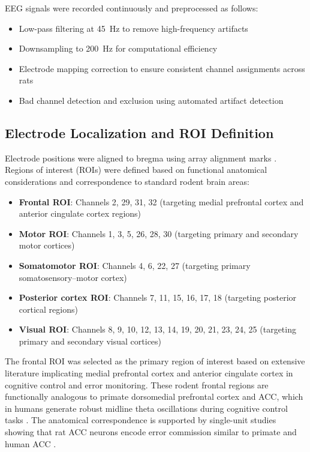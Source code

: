 \documentclass[11pt]{article}
\begin{document}
EEG signals were recorded continuously and preprocessed as follows:
\begin{itemize}
\item Low-pass filtering at 45~Hz to remove high-frequency artifacts
\item Downsampling to 200~Hz for computational efficiency
\item Electrode mapping correction to ensure consistent channel assignments across rats
\item Bad channel detection and exclusion using automated artifact detection
\end{itemize}

\subsection{Electrode Localization and ROI Definition}

Electrode positions were aligned to bregma using array alignment marks \citep{doutel2024volitional}. Regions of interest (ROIs) were defined based on functional anatomical considerations and correspondence to standard rodent brain areas:

\begin{itemize}
\item \textbf{Frontal ROI}: Channels 2, 29, 31, 32 (targeting medial prefrontal cortex and anterior cingulate cortex regions)
\item \textbf{Motor ROI}: Channels 1, 3, 5, 26, 28, 30 (targeting primary and secondary motor cortices)
\item \textbf{Somatomotor ROI}: Channels 4, 6, 22, 27 (targeting primary somatosensory–motor cortex)
\item \textbf{Posterior cortex ROI}: Channels 7, 11, 15, 16, 17, 18 (targeting posterior cortical regions)
\item \textbf{Visual ROI}: Channels 8, 9, 10, 12, 13, 14, 19, 20, 21, 23, 24, 25 (targeting primary and secondary visual cortices)
\end{itemize}

The frontal ROI was selected as the primary region of interest based on extensive literature implicating medial prefrontal cortex and anterior cingulate cortex in cognitive control and error monitoring. These rodent frontal regions are functionally analogous to primate dorsomedial prefrontal cortex and ACC, which in humans generate robust midline theta oscillations during cognitive control tasks \citep{cavanagh2014frontal}. The anatomical correspondence is supported by single-unit studies showing that rat ACC neurons encode error commission similar to primate and human ACC \citep{totah2009anterior}.
\end{document}
